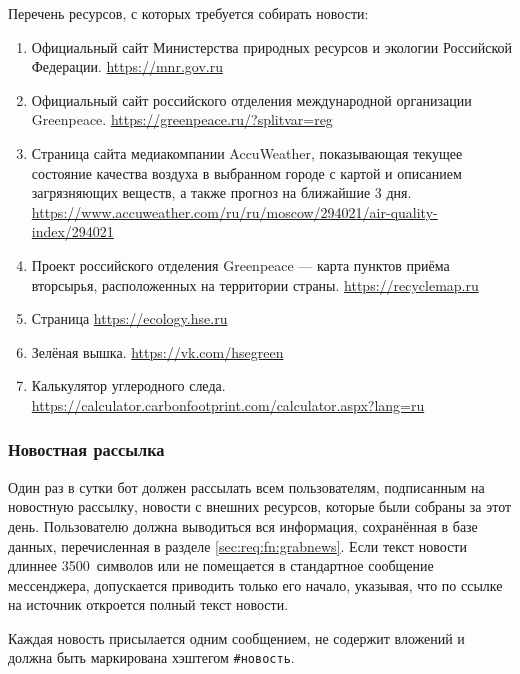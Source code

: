     Перечень ресурсов, с которых требуется собирать новости:
    \begin{enumerate}
        \item
            Официальный сайт Министерства природных ресурсов и экологии Российской Федерации.
            \url{https://mnr.gov.ru}
        \item
            Официальный сайт российского отделения международной организации Greenpeace.
            \url{https://greenpeace.ru/?splitvar=reg}
        \item
            Страница сайта медиакомпании AccuWeather, показывающая текущее состояние качества воздуха
            в выбранном городе с картой и описанием загрязняющих веществ, а также прогноз на ближайшие
            3 дня. 
            \url{https://www.accuweather.com/ru/ru/moscow/294021/air-quality-index/294021}
        \item
            Проект российского отделения Greenpeace --- карта пунктов приёма вторсырья,
            расположенных на территории страны.
            \url{https://recyclemap.ru}
        \item
            Страница \url{https://ecology.hse.ru}
        \item
            Зелёная вышка. \url{https://vk.com/hsegreen}
        \item
            Калькулятор углеродного следа.
            \url{https://calculator.carbonfootprint.com/calculator.aspx?lang=ru}

    \end{enumerate}

\subsubsection{Новостная рассылка}
    \label{sec:req:fn:news}
    Один раз в сутки бот
    должен рассылать всем пользователям, подписанным на новостную рассылку, новости с внешних
    ресурсов, которые были собраны за этот день. Пользователю
    должна выводиться вся информация, сохранённая в базе данных, перечисленная в разделе
    \ref{sec:req:fn:grabnews}. Если текст новости длиннее 3500~символов или не помещается в
    стандартное сообщение мессенджера, допускается приводить только его начало, указывая,
    что по ссылке на источник откроется полный текст новости.

    Каждая новость присылается одним сообщением, не содержит вложений и
    должна быть маркирована хэштегом \hbox{\texttt{\#новость}}.

